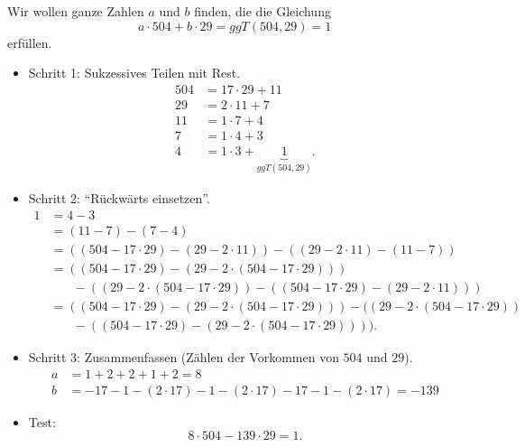 \begin{bsp}
 Wir wollen ganze Zahlen $a$ und $b$ finden, die die Gleichung
 \[
 a\cdot 504+b\cdot 29=ggT(504,29)=1
 \]
 erfüllen.
\begin{itemize}
 \item Schritt 1: Sukzessives Teilen mit Rest.
\begin{align*}
	504 &= 17 \cdot 29 + 11\\
	29 &= 2 \cdot 11 + 7\\
	11 &= 1 \cdot 7 + 4\\
	7 &= 1 \cdot 4 + 3\\
	4 &= 1 \cdot 3 + \underbrace{1}_{ggT(504,29)}.
\end{align*}
 \item Schritt 2: ``Rückwärts einsetzen''.
 \begin{align*}
	1&=4-3\\
	&=(11-7)-(7-4)\\
	&=((504-17\cdot 29)-(29-2\cdot 11))-((29-2\cdot 11)-(11-7))\\
	&=((504-17\cdot 29)-(29-2\cdot (504-17\cdot 29)))\\
	&\phantom{abst}-((29-2\cdot (504-17\cdot 29))-((504-17\cdot 29)-(29-2\cdot 11)))\\
	&=((504-17\cdot 29)-(29-2\cdot (504-17\cdot 29)))
	-((29-2\cdot (504-17\cdot 29))\\
	&\phantom{abst}-((504-17\cdot 29)-(29-2\cdot (504-17\cdot 29)))).
 \end{align*}
	\item Schritt 3: Zusammenfassen (Zählen der Vorkommen von $504$ und $29$).
 \begin{align*}
 	a&=1+2+2+1+2=8\\
 	b&=-17-1-(2\cdot 17)-1-(2\cdot 17)-17-1-(2\cdot 17)=-139
 \end{align*}
\item Test:
 \[
 8\cdot 504-139\cdot 29=1.
 \]
\end{itemize}
\end{bsp}



